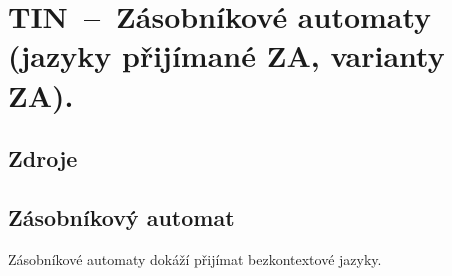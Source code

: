 

\graphicspath{{tin/zasobnikove_automaty/figures}}


\chapter{TIN~--~Zásobníkové automaty (jazyky přijímané ZA, varianty ZA).}


\section{Zdroje}

\begin{compactitem}
    \item {}
    \item {}
    \item {}
    \item {}
\end{compactitem}


\section{Zásobníkový automat}

Zásobníkové automaty dokáží přijímat bezkontextové jazyky.

